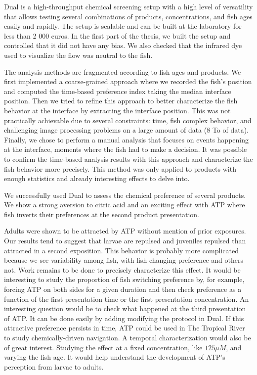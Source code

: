   Dual is a high-throughput chemical screening setup with a high level of versatility that allows testing several combinations of products, concentrations, and fish ages easily and rapidly. The setup is scalable and can be built at the laboratory for less than 2 000 euros. In the first part of the thesis, we built the setup and controlled that it did not have any bias. We also checked that the infrared dye used to visualize the flow was neutral to the fish.

  The analysis methods are fragmented according to fish ages and products. We first implemented a coarse-grained approach where we recorded the fish's position and computed the time-based preference index taking the median interface position. Then we tried to refine this approach to better characterize the fish behavior at the interface by extracting the interface position. This was not practically achievable due to several constraints: time, fish complex behavior, and challenging image processing problems on a large amount of data (8 To of data). Finally, we chose to perform a manual analysis that focuses on events happening at the interface, moments where the fish had to make a decision. It was possible to confirm the time-based analysis results with this approach and characterize the fish behavior more precisely. This method was only applied to products with enough statistics and already interesting effects to delve into.

  We successfully used Dual to assess the chemical preference of several products. We show a strong aversion to citric acid and an exciting effect with ATP where fish inverts their preferences at the second product presentation.

  Adults were shown to be attracted by ATP without mention of prior exposures. Our results tend to suggest that larvae are repulsed and juveniles repulsed than attracted in a second exposition. This behavior is probably more complicated because we see variability among fish, with fish changing preference and others not. Work remains to be done to precisely characterize this effect. It would be interesting to study the proportion of fish switching preference by, for example, forcing ATP on both sides for a given duration and then check preference as a function of the first presentation time or the first presentation concentration. An interesting question would be to check what happened at the third presentation of ATP. It can be done easily by adding modifying the protocol in Dual. If this attractive preference persists in time, ATP could be used in The Tropical River to study chemically-driven navigation. A temporal characterization would also be of great interest. Studying the effect at a fixed concentration, like $125 \mu M$, and varying the fish age. It would help understand the development of ATP's perception from larvae to adults.

